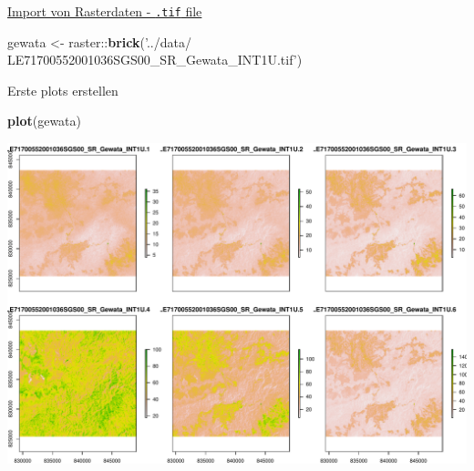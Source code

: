 \documentclass[ignorenonframetext,]{beamer}
\newenvironment{Shaded}{\begin{snugshade}}{\end{snugshade}}
\newcommand{\KeywordTok}[1]{\textcolor[rgb]{0.26,0.66,0.93}{\textbf{#1}}}
\newcommand{\NormalTok}[1]{\textcolor[rgb]{0.74,0.68,0.62}{#1}}
\newcommand{\OperatorTok}[1]{\textcolor[rgb]{0.74,0.68,0.62}{#1}}
\newcommand{\StringTok}[1]{\textcolor[rgb]{0.02,0.61,0.04}{#1}}
\begin{document}
\begin{frame}[fragile]{\href{https://geoscripting-wur.github.io/IntroToRaster/}{Import
von Rasterdaten - \texttt{.tif} file}}
\protect\hypertarget{import-von-rasterdaten---.tif-file}{}

\begin{Shaded}
\begin{Highlighting}[]
\NormalTok{gewata <-}\StringTok{ }\NormalTok{raster}\OperatorTok{::}\KeywordTok{brick}\NormalTok{(}\StringTok{'../data/}
\StringTok{LE71700552001036SGS00_SR_Gewata_INT1U.tif'}\NormalTok{)}
\end{Highlighting}
\end{Shaded}

\end{frame}

\begin{frame}[fragile]{Erste plots erstellen}
\protect\hypertarget{erste-plots-erstellen}{}

\begin{Shaded}
\begin{Highlighting}[]
\KeywordTok{plot}\NormalTok{(gewata)}
\end{Highlighting}
\end{Shaded}

\includegraphics{A8_Rasterdaten_files/figure-beamer/unnamed-chunk-15-1.pdf}

\end{frame}
\end{document}
